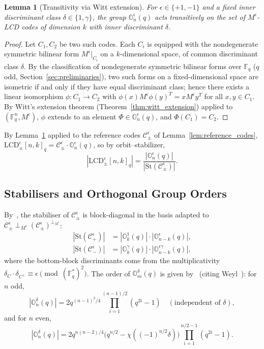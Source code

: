 \documentclass[11pt]{article}
\newcommand{\FF}{\mathbb{F}}
\newcommand{\0}{\mathbf{0}}
\newcommand{\1}{\mathbf{1}}
\theoremstyle{plain}
\newtheorem{lemma}[theorem]{Lemma}
\theoremstyle{definition}
\theoremstyle{remark}
\begin{document}
\begin{lemma}[Transitivity via Witt extension]\label{lem:witt_transitivity}
For $\epsilon \in \{+1, -1\}$ and a fixed inner discriminant class $\delta \in \{1, \gamma\}$, the group $\mathbb{O}_n^\epsilon(q)$ acts transitively on the set of $M^\epsilon$-LCD codes of dimension $k$ with inner discriminant $\delta$.
\end{lemma}
\begin{proof}
Let $C_1, C_2$ be two such codes. Each $C_i$ is equipped with the nondegenerate symmetric bilinear form $M^\epsilon|_{C_i}$ on a $k$-dimensional space, of common discriminant class $\delta$. By the classification of nondegenerate symmetric bilinear forms over $\FF_q$ ($q$ odd, Section~\ref{sec:preliminaries}), two such forms on a fixed-dimensional space are isometric if and only if they have equal discriminant class; hence there exists a linear isomorphism $\phi: C_1 \to C_2$ with $\phi(x) M^\epsilon \phi(y)^T = x M^\epsilon y^T$ for all $x, y \in C_1$. By Witt's extension theorem (Theorem~\ref{thm:witt_extension}) applied to $(\FF_q^n, M^\epsilon)$, $\phi$ extends to an element $\Phi \in \mathbb{O}_n^\epsilon(q)$, and $\Phi(C_1) = C_2$.
\end{proof}

By Lemma~\ref{lem:witt_transitivity} applied to the reference codes $\mathcal{C}_\pm^\epsilon$ of Lemma~\ref{lem:reference_codes}, $\mathrm{LCD}^\epsilon_\pm[n, k]_q = \mathcal{C}_\pm^\epsilon \cdot \mathbb{O}_n^\epsilon(q)$, so by orbit--stabilizer,
\begin{equation}\label{eq:orbit_stab}
|\mathrm{LCD}^\epsilon_\pm[n, k]_q| = \frac{|\mathbb{O}_n^\epsilon(q)|}{|\mathrm{St}(\mathcal{C}_\pm^\epsilon)|}.
\end{equation}

\subsection{Stabilisers and Orthogonal Group Orders}

By~\cite[Corollary~30]{carlet2019new}, the stabiliser of $\mathcal{C}_\pm^\epsilon$ is block-diagonal in the basis adapted to $\mathcal{C}_\pm^\epsilon \perp_{M^\epsilon} (\mathcal{C}_\pm^\epsilon)^{\perp_{M^\epsilon}}$:
\begin{align*}
|\mathrm{St}(\mathcal{C}_+^\epsilon)| &= |\mathbb{O}_k^1(q)| \cdot |\mathbb{O}_{n-k}^{\epsilon}(q)|, \\
|\mathrm{St}(\mathcal{C}_-^\epsilon)| &= |\mathbb{O}_k^\gamma(q)| \cdot |\mathbb{O}_{n-k}^{\epsilon\gamma}(q)|,
\end{align*}
where the bottom-block discriminants come from the multiplicativity $\delta_C \cdot \delta_{C^\perp} \equiv \epsilon \pmod{(\FF_q^*)^2}$. The order of $\mathbb{O}_m^\delta(q)$ is given by~\cite[Eqs.~(11)--(12)]{carlet2019new} (citing Weyl~\cite{weyl1939classical}): for $n$ odd,
\[
|\mathbb{O}_n^\delta(q)| = 2 q^{(n-1)^2/4} \prod_{i=1}^{(n-1)/2}(q^{2i} - 1) \quad (\text{independent of } \delta),
\]
and for $n$ even,
\[
|\mathbb{O}_n^\delta(q)| = 2 q^{n(n-2)/4} \bigl(q^{n/2} - \chi((-1)^{n/2}\delta)\bigr) \prod_{i=1}^{n/2 - 1}(q^{2i} - 1).
\]
\end{document}
